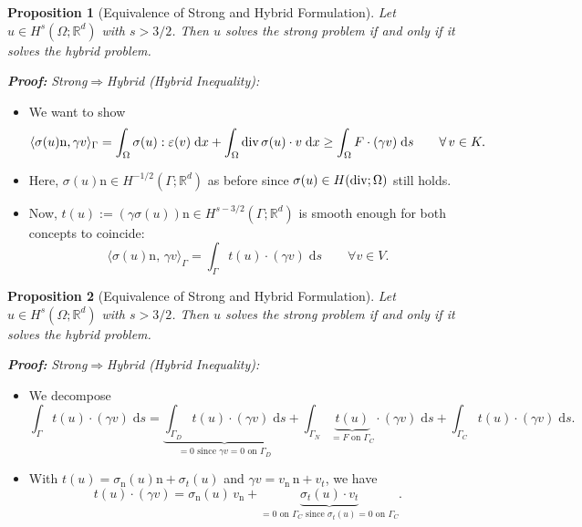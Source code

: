 \documentclass[10pt,aspectratio=169]{beamer}
\newtheorem{proposition}{Proposition}[section]
\def\R{{\mathbb R}}
\def\d{{\mathrm{d}}}
\def\dx{{\d x}}
\def\ds{{\d s}}
\newcommand{\diver}{\operatornamewithlimits{div}}
\begin{document}
\begin{frame}
	\begin{proposition}[Equivalence of Strong and Hybrid Formulation]
		Let $u\in H^s(\Omega;\R^d)$ with $s>3/2$. Then $u$ solves the strong problem if and only if it solves the hybrid problem.
	\end{proposition}
	\textbf{\em Proof:} {\em Strong\enspace}$\Longrightarrow${\em\enspace Hybrid (Hybrid Inequality):}
	\begin{itemize}
		\item We want to show
		      \begin{equation*}
			      \langle \sigma(u)\mathrm n,\gamma v\rangle_\Gamma
			      =
			      \int_\Omega \sigma(u):\varepsilon(v)\;\dx
			      +
			      \int_\Omega \diver\sigma(u)\cdot v\;\dx\ge \int_\Omega F\cdot(\gamma v)\;\ds
			      \qquad
			      \forall\, v\in K.
		      \end{equation*}
		\item Here, $\sigma(u)\mathrm{n}\in H^{-1/2}(\Gamma;\R^d)$ as before since $\sigma(u)\in H(\diver;\Omega)$ still holds.
		\item Now, $t(u):= (\gamma\sigma(u))\mathrm{n}\in H^{s-3/2}(\Gamma;\R^d)$ is smooth enough for both concepts to coincide:
		      \begin{equation*}
			      \langle \sigma(u)\mathrm{n},\, \gamma v\rangle_\Gamma = \int_\Gamma t(u)\cdot(\gamma v)\;\ds\qquad \forall v\in V.
		      \end{equation*}
	\end{itemize}
\end{frame}
\begin{frame}
	\begin{proposition}[Equivalence of Strong and Hybrid Formulation]
		Let $u\in H^s(\Omega;\R^d)$ with $s>3/2$. Then $u$ solves the strong problem if and only if it solves the hybrid problem.
	\end{proposition}
	\textbf{\em Proof:} {\em Strong\enspace}$\Longrightarrow${\em\enspace Hybrid (Hybrid Inequality):}
	\begin{itemize}
		\item We decompose
		      \begin{equation*}
			      \int_\Gamma t(u)\cdot(\gamma v)\;\ds =\underbrace{\int_{\Gamma_D} t(u)\cdot(\gamma v)\;\ds}_{=0\text{ since } \gamma v= 0 \text{ on }\Gamma_D}+\int_{\Gamma_N} \underbrace{t(u)}_{= F\text{ on }\Gamma_C}\cdot(\gamma v)\;\ds+\int_{\Gamma_C} t(u)\cdot(\gamma v)\;\ds.
		      \end{equation*}
		\item With $t(u) = \sigma_\mathrm{n}(u)\mathrm{n}+\sigma_t(u)$ and $\gamma v = v_\mathrm{n}\,\mathrm{n}+v_t$, we have
		      \begin{equation*}
			      t(u)\cdot(\gamma v) = \sigma_\mathrm{n}(u)\,v_\mathrm{n}+\underbrace{\sigma_t(u)\cdot v_t}_{=0\text{ on }\Gamma_C \text{ since }\sigma_t(u)=0\text{ on }\Gamma_C}.
		      \end{equation*}
	\end{itemize}
\end{frame}
\end{document}
